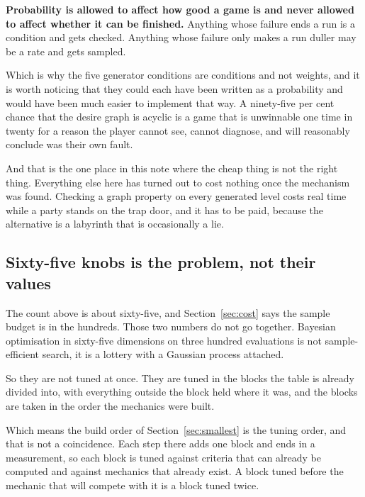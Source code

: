 \documentclass[11pt,a4paper]{article}
\begin{document}
\begin{sectionbox}
\textbf{Probability is allowed to affect how good a game is and never allowed to affect whether it
can be finished.} Anything whose failure ends a run is a condition and gets checked. Anything whose
failure only makes a run duller may be a rate and gets sampled.
\end{sectionbox}

Which is why the five generator conditions are conditions and not weights, and it is worth noticing
that they could each have been written as a probability and would have been much easier to
implement that way. A ninety-five per cent chance that the desire graph is acyclic is a game that is
unwinnable one time in twenty for a reason the player cannot see, cannot diagnose, and will
reasonably conclude was their own fault.

\begin{alarmbox}
And that is the one place in this note where the cheap thing is not the right thing. Everything else
here has turned out to cost nothing once the mechanism was found. Checking a graph property on every
generated level costs real time while a party stands on the trap door, and it has to be paid, because
the alternative is a labyrinth that is occasionally a lie.
\end{alarmbox}

\subsection{Sixty-five knobs is the problem, not their values}

The count above is about sixty-five, and Section~\ref{sec:cost} says the sample budget is in the
hundreds. Those two numbers do not go together. Bayesian optimisation in sixty-five dimensions on
three hundred evaluations is not sample-efficient search, it is a lottery with a Gaussian process
attached.

So they are not tuned at once. They are tuned in the blocks the table is already divided into,
with everything outside the block held where it was, and the blocks are taken in the order the
mechanics were built.

\begin{sectionbox}
Which means the build order of Section~\ref{sec:smallest} is the tuning order, and that is not a
coincidence. Each step there adds one block and ends in a measurement, so each block is tuned
against criteria that can already be computed and against mechanics that already exist. A block
tuned before the mechanic that will compete with it is a block tuned twice.
\end{sectionbox}
\end{document}
